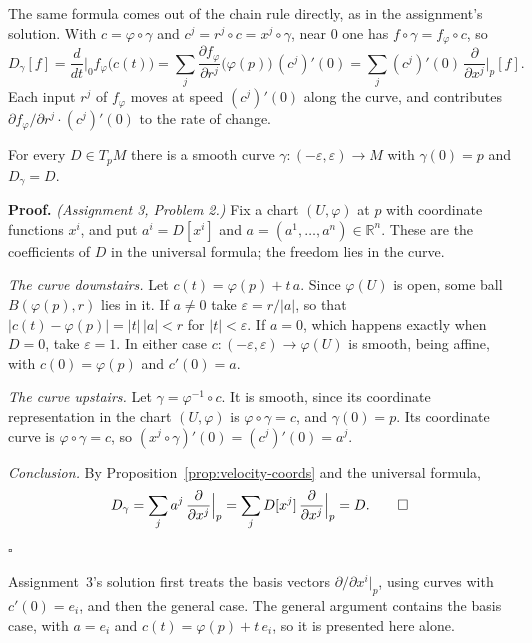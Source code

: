 \documentclass[11pt]{report}
\makeatletter
\newcounter{thmcounter}[section]
\renewenvironment{proof}[1][Proof]{\noindent\textbf{#1.} }{\hfill$\square$\par\vspace{5pt}}
\newcommand{\thmlabel}[1]{\edef\@currentlabel{\arabic{section}.\arabic{thmcounter}}\label{#1}}
\newcommand{\leeref}[1]{\par\smallskip{\raggedleft\footnotesize\textsc{Lee}:\ #1\par}}
\makeatother
\begin{document}
The same formula comes out of the chain rule directly, as in the assignment's solution. With $c = \varphi \circ \gamma$ and $c^j = r^j \circ c = x^j \circ \gamma$, near $0$ one has $f \circ \gamma = f_\varphi \circ c$, so
\[
D_\gamma[f] = \frac{d}{dt}\Big|_0 f_\varphi\big(c(t)\big) = \sum_{j} \frac{\partial f_\varphi}{\partial r^j}\big(\varphi(p)\big)\,(c^j)'(0) = \sum_j (c^j)'(0)\,\frac{\partial}{\partial x^j}\Big|_p[f].
\]
Each input $r^j$ of $f_\varphi$ moves at speed $(c^j)'(0)$ along the curve, and contributes $\partial f_\varphi/\partial r^j \cdot (c^j)'(0)$ to the rate of change.

\begin{thmbox}\thmlabel{thm:every-vector-velocity}
For every $D \in T_pM$ there is a smooth curve $\gamma : (-\varepsilon, \varepsilon) \to M$ with $\gamma(0) = p$ and $D_\gamma = D$.
\leeref{Proposition 3.23}
\end{thmbox}

\begin{proof}
\textit{(Assignment 3, Problem 2.)} Fix a chart $(U, \varphi)$ at $p$ with coordinate functions $x^i$, and put $a^i = D[x^i]$ and $a = (a^1, \ldots, a^n) \in \mathbb{R}^n$. These are the coefficients of $D$ in the universal formula; the freedom lies in the curve.

\emph{The curve downstairs.} Let $c(t) = \varphi(p) + t\,a$. Since $\varphi(U)$ is open, some ball $B(\varphi(p), r)$ lies in it. If $a \ne 0$ take $\varepsilon = r/|a|$, so that $|c(t) - \varphi(p)| = |t|\,|a| < r$ for $|t| < \varepsilon$. If $a = 0$, which happens exactly when $D = 0$, take $\varepsilon = 1$. In either case $c : (-\varepsilon, \varepsilon) \to \varphi(U)$ is smooth, being affine, with $c(0) = \varphi(p)$ and $c'(0) = a$.

\emph{The curve upstairs.} Let $\gamma = \varphi^{-1} \circ c$. It is smooth, since its coordinate representation in the chart $(U,\varphi)$ is $\varphi \circ \gamma = c$, and $\gamma(0) = p$. Its coordinate curve is $\varphi \circ \gamma = c$, so $(x^j \circ \gamma)'(0) = (c^j)'(0) = a^j$.

\emph{Conclusion.} By Proposition~\ref{prop:velocity-coords} and the universal formula,
\[
D_\gamma = \sum_j a^j\, \frac{\partial}{\partial x^j}\Big|_p = \sum_j D[x^j]\, \frac{\partial}{\partial x^j}\Big|_p = D. \qedhere
\]
\end{proof}

Assignment~3's solution first treats the basis vectors $\partial/\partial x^i|_p$, using curves with $c'(0) = e_i$, and then the general case. The general argument contains the basis case, with $a = e_i$ and $c(t) = \varphi(p) + t\,e_i$, so it is presented here alone.
\end{document}
